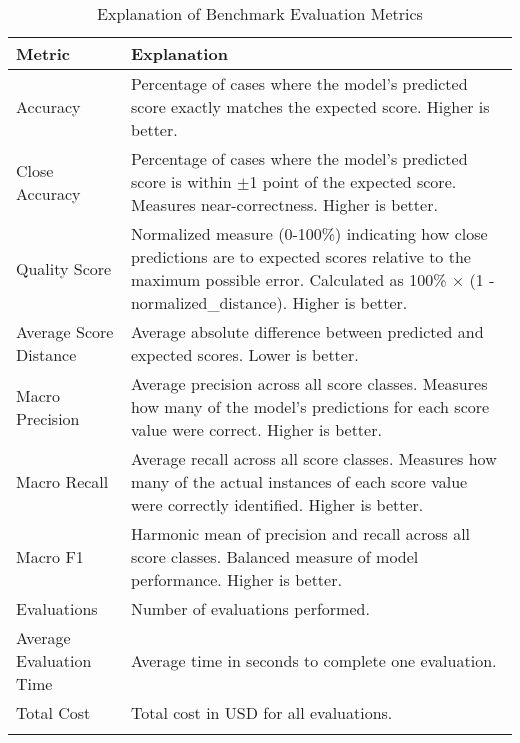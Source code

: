 \begin{table}[htbp]
\centering
\caption{Explanation of Benchmark Evaluation Metrics}
\begin{tabular}{p{3cm}p{9cm}}
\toprule
\textbf{Metric} & \textbf{Explanation} \\
\midrule
Accuracy & Percentage of cases where the model's predicted score exactly matches the expected score. Higher is better. \\
\addlinespace
Close Accuracy & Percentage of cases where the model's predicted score is within $\pm$1 point of the expected score. Measures near-correctness. Higher is better. \\
\addlinespace
Quality Score & Normalized measure (0-100\%) indicating how close predictions are to expected scores relative to the maximum possible error. Calculated as 100\% $\times$ (1 - normalized\_distance). Higher is better. \\
\addlinespace
Average Score Distance & Average absolute difference between predicted and expected scores. Lower is better. \\
\addlinespace
Macro Precision & Average precision across all score classes. Measures how many of the model's predictions for each score value were correct. Higher is better. \\
\addlinespace
Macro Recall & Average recall across all score classes. Measures how many of the actual instances of each score value were correctly identified. Higher is better. \\
\addlinespace
Macro F1 & Harmonic mean of precision and recall across all score classes. Balanced measure of model performance. Higher is better. \\
\addlinespace
Evaluations & Number of evaluations performed. \\
\addlinespace
Average Evaluation Time & Average time in seconds to complete one evaluation. \\
\addlinespace
Total Cost & Total cost in USD for all evaluations. \\
\addlinespace
\bottomrule
\end{tabular}
\end{table}